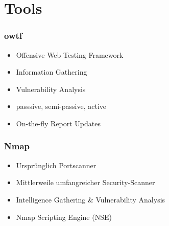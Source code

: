 \documentclass[11pt]{beamer}
\begin{document}
\section{Tools}
\label{sec-2}
\begin{frame}[fragile]\frametitle{owtf}
\label{sec-2-1}
\begin{itemize}

\item Offensive Web Testing Framework\\
\label{sec-2-1-1}%
\item Information Gathering\\
\label{sec-2-1-2}%
\item Vulnerability Analysis\\
\label{sec-2-1-3}%
\item passsive, semi-passive, active\\
\label{sec-2-1-4}%
\item On-the-fly Report Updates\\
\label{sec-2-1-5}%
\end{itemize} %
\end{frame}
\begin{frame}[fragile]\frametitle{Nmap}
\label{sec-2-2}
\begin{itemize}

\item Ursprünglich Portscanner\\
\label{sec-2-2-1}%
\item Mittlerweile umfangreicher Security-Scanner\\
\label{sec-2-2-2}%
\item Intelligence Gathering \& Vulnerability Analysis\\
\label{sec-2-2-3}%
\item Nmap Scripting Engine (NSE)\\
\label{sec-2-2-4}%
\end{itemize} %
\end{frame}
\end{document}
